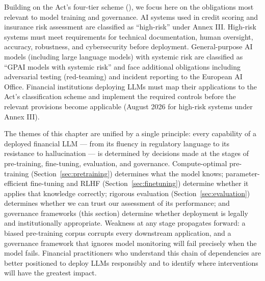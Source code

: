 \begin{context}
\begin{remark}
\label{rem:eu-ai-act-highrisk}
Building on the Act's four-tier scheme (), we focus here on the
obligations most relevant to model training and governance. AI systems used in credit
scoring and insurance risk assessment are classified as ``high-risk'' under Annex III.
High-risk systems must meet requirements
for technical documentation, human oversight, accuracy, robustness, and
cybersecurity before deployment.  General-purpose AI models (including
large language models) with systemic risk are classified as ``GPAI models
with systemic risk'' and face additional obligations including adversarial
testing (red-teaming) and incident reporting to the European AI Office.
Financial institutions deploying LLMs must map their applications to the
Act's classification scheme and implement the required controls before the
relevant provisions become applicable (August 2026 for high-risk systems
under Annex III).
\end{remark}

The themes of this chapter are unified by a single principle: every capability
of a deployed financial LLM --- from its fluency in regulatory language to its
resistance to hallucination --- is determined by decisions made at the stages
of pre-training, fine-tuning, evaluation, and governance.  Compute-optimal
pre-training (Section~\ref{sec:pretraining}) determines what the model knows;
parameter-efficient fine-tuning and RLHF (Section~\ref{sec:finetuning})
determine whether it applies that knowledge correctly; rigorous evaluation
(Section~\ref{sec:evaluation}) determines whether we can trust our assessment
of its performance; and governance frameworks (this section) determine whether
deployment is legally and institutionally appropriate.  Weakness at any stage
propagates forward: a biased pre-training corpus corrupts every downstream
application, and a governance framework that ignores model monitoring will
fail precisely when the model fails.  Financial practitioners who understand
this chain of dependencies are better positioned to deploy LLMs responsibly
and to identify where interventions will have the greatest impact.

\end{context}

